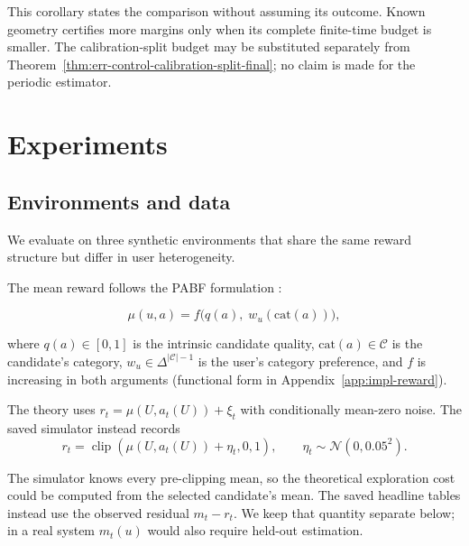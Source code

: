 \documentclass{article} %
\begin{document}
This corollary states the comparison without assuming its outcome. Known geometry certifies more margins only when its complete finite-time budget is smaller. The calibration-split budget may be substituted separately from Theorem~\ref{thm:err-control-calibration-split-final}; no claim is made for the periodic estimator.

\section{Experiments}

\label{sec:experiments}

\subsection{Environments and data}

\label{sec:exp-setup}

We evaluate on three synthetic environments that share the same reward structure but differ in user heterogeneity.

The mean reward follows the PABF formulation \citep{jin2026personalizing}:

\begin{equation}
\label{eq:exp-mu}
\mu(u,a) = f\bigl(q(a),\; w_u(\mathrm{cat}(a))\bigr),
\end{equation}

where $q(a)\in[0,1]$ is the intrinsic candidate quality, $\mathrm{cat}(a)\in\mathcal{C}$ is the candidate's category, $w_u\in\Delta^{|\mathcal{C}|-1}$ is the user's category preference, and $f$ is increasing in both arguments (functional form in Appendix~\ref{app:impl-reward}).

The theory uses $r_t=\mu(U,a_t(U))+\xi_t$ with conditionally mean-zero noise. The saved simulator instead records
\begin{equation}
\label{eq:exp-clipped-reward}
r_t=\operatorname{clip}\!\left(\mu(U,a_t(U))+\eta_t,0,1\right),
\qquad
\eta_t\sim\mathcal N(0,0.05^2).
\end{equation}

The simulator knows every pre-clipping mean, so the theoretical exploration cost could be computed from the selected candidate's mean. The saved headline tables instead use the observed residual \(m_t-r_t\). We keep that quantity separate below; in a real system \(m_t(u)\) would also require held-out estimation.
\end{document}
